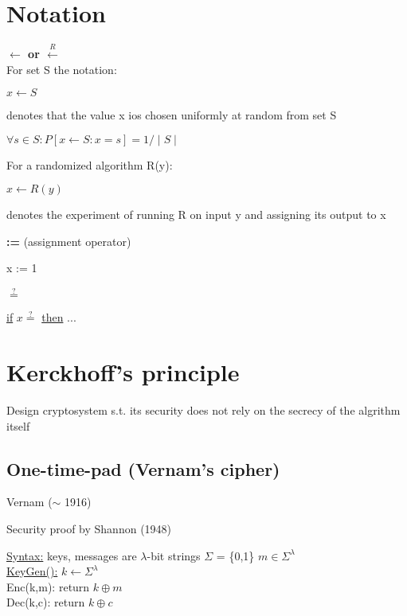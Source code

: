 \documentclass{report}
\begin{document}
 \section{Notation}
 \begin{compactenum}[$\star$]
 	\item \textbf{$\leftarrow$ or $\stackrel{R}{\leftarrow}$} \\
 	For set S the notation: 
 	\begin{center}
 		$x \leftarrow S$
 	\end{center}
 	denotes that the value x ios chosen uniformly at random from set S
 	\begin{center}
 		$\forall s \in S: P[x \leftarrow S: x=s] = 1/\mid S \mid$
 	\end{center}
 	For a randomized algorithm R(y):
 	\begin{center}
 		$x \leftarrow R(y)$
 	\end{center}
 	denotes the experiment of running R on input y and assigning its output to x
 	\item \textbf{:=} (assignment operator)
 	\begin{center}
 		x := 1
 	\end{center}
 	\item \textbf{$\stackrel{?}{=}$} \\
 	\begin{center}
 		\underline{if} $x \stackrel{?}{=}$ \underline{then} ...
 	\end{center}
 \end{compactenum}
 
 \section{Kerckhoff's principle}
 	Design cryptosystem s.t. its security does not rely on the secrecy of the algrithm itself
 
 \subsection{One-time-pad (Vernam's cipher)}
 	\begin{compactenum}[$\bullet$]
 		\item Vernam ($\sim$ 1916)
 		\item Security proof by Shannon (1948)
 	\end{compactenum}
 	\underline{Syntax:} keys, messages are $\lambda$-bit strings $\Sigma$ = \{0,1\} $m \in \Sigma ^{\lambda} $ \\
 	\underline{KeyGen():} $k \leftarrow \Sigma ^{\lambda}$ \\
 	Enc(k,m): return $k \oplus m$ \\
 	Dec(k,c): return $k \oplus c$
 	
\end{document}
